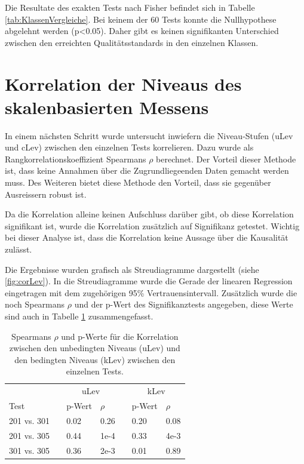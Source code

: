 Die Resultate des exakten Tests nach Fisher befindet sich in Tabelle \ref{tab:KlassenVergleiche}. Bei keinem der 60 Tests konnte die Nullhypothese abgelehnt werden (p<0.05). Daher gibt es keinen signifikanten Unterschied zwischen den erreichten Qualitätsstandards in den einzelnen Klassen.  

\section{Korrelation der Niveaus des skalenbasierten Messens}

In einem nächsten Schritt wurde untersucht inwiefern die Niveau-Stufen (uLev und cLev) zwischen den einzelnen Tests korrelieren. Dazu wurde als Rangkorrelationskoeffizient Spearmans $\rho$ berechnet. Der Vorteil dieser Methode ist, dass keine Annahmen über die Zugrundliegeenden Daten gemacht werden muss. Des Weiteren bietet diese Methode den Vorteil, dass sie gegenüber Ausreissern robust ist. 

Da die Korrelation alleine keinen Aufschluss darüber gibt, ob diese Korrelation signifikant ist, wurde die Korrelation zusätzlich auf Signifikanz getestet. Wichtig bei dieser Analyse ist, dass die Korrelation keine Aussage über die Kausalität zulässt.


Die Ergebnisse wurden grafisch als Streudiagramme dargestellt (siehe \ref{fig:corLev}). In die Streudiagramme wurde die Gerade der linearen Regression eingetragen mit dem zugehörigen 95\% Vertrauensintervall. Zusätzlich wurde die noch Spearmans $\rho$ und der p-Wert des Signifikanztests angegeben, diese Werte sind auch in Tabelle \ref{tab:CorNiveau} zusammengefasst.



\begin{table}[htbp]
  \centering
\begin{tabular}{@{}lllllll@{}}
\toprule
 &&  \multicolumn{2}{c}{uLev} &&  \multicolumn{2}{c}{kLev}\\ 
 \cmidrule{3-4}  \cmidrule{6-7}
 Test && p-Wert & $\rho$ && p-Wert & $\rho$  \\ 
\midrule
 201 vs. 301 &&   0.02 & 0.26 && 0.20 & 0.08    \\ 
 201 vs. 305 &&   0.44 & 1e-4 && 0.33 & 4e-3      \\
 301 vs. 305 &&   0.36 & 2e-3 && 0.01 & 0.89    \\
\bottomrule
\end{tabular} 
  \caption{Spearmans $\rho$ und p-Werte für die Korrelation zwischen den unbedingten Niveaus (uLev) und den bedingten Niveaus (kLev) zwischen den einzelnen Tests.  }
  \label{tab:CorNiveau}
\end{table}
 
